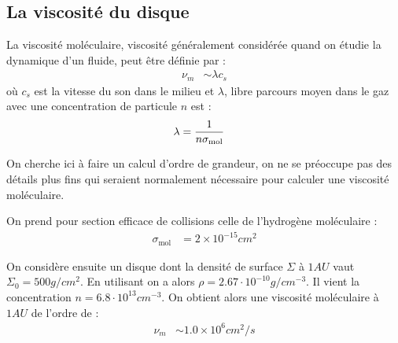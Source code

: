 \subsection{La viscosité du disque}\label{sec:viscosite}%

La viscosité moléculaire, viscosité généralement considérée quand on étudie la dynamique d'un fluide, peut être définie par : 
\begin{align}
\nu_m &\sim \lambda c_s
\end{align}
où $c_s$ est la vitesse du son dans le milieu et $\lambda$, libre parcours moyen dans le gaz avec une concentration de particule $n$ est :
\begin{align}
\lambda &= \frac{1}{n\sigma_\text{mol}}
\end{align}

On cherche ici à faire un calcul d'ordre de grandeur, on ne se préoccupe pas des détails plus fins qui seraient normalement nécessaire pour calculer une viscosité moléculaire. 

On prend pour section efficace de collisions celle de l'hydrogène moléculaire \citep{chapman1970mathematical} :
\begin{align}
\sigma_\text{mol} &= 2\times 10^{-15}\unit{cm^2}
\end{align}

On considère ensuite un disque dont la densité de surface $\Sigma$ à $1\unit{AU}$ vaut $\Sigma_0 = 500\unit{g/cm^2}$. En utilisant  on a alors $\rho=2.67\cdot 10^{-10}\unit{g/cm^{-3}}$. Il vient la concentration $n=6.8\cdot 10^{13}\unit{cm^{-3}}$. On obtient alors une viscosité moléculaire à $1\unit{AU}$ de l'ordre de : 
\begin{align}
\nu_m &\sim 1.0\times 10^6\unit{cm^2/s}
\end{align}

